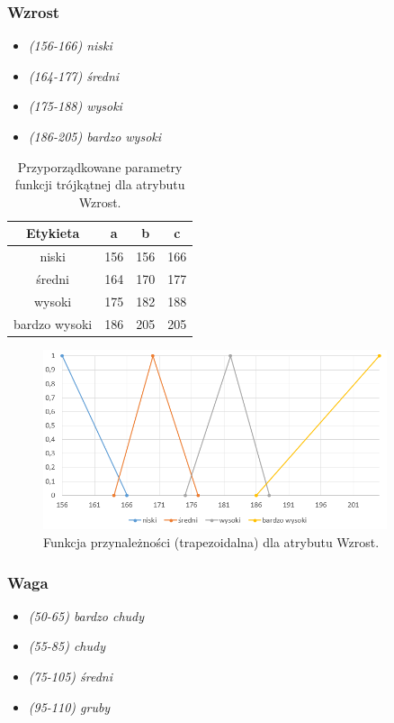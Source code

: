 \documentclass{classrep}
\begin{document}
	\newpage
	\subsubsection{Wzrost}
	\begin{itemize}
		\item \textsl{(156-166) niski}
		\item \textsl{(164-177) średni}
		\item \textsl{(175-188) wysoki}
		\item \textsl{(186-205) bardzo wysoki}
	\end{itemize}
	
	\begin{table}[h!]
		\centering
		\begin{tabular} {c c c c}
			\hline
			\textbf{Etykieta} & \textbf{a} & \textbf{b} & \textbf{c} \\ [0.5ex] 
			\hline	
			\hline 
			niski & 156 & 156 & 166 \\
			średni & 164 & 170 & 177 \\
			wysoki & 175 & 182 & 188 \\
			bardzo wysoki & 186 & 205 & 205  \\
			\hline
		\end{tabular}
		\caption{Przyporządkowane parametry funkcji trójkątnej dla atrybutu Wzrost. }
		\label{tabelaWzrost}
	\end{table}
	
	\begin{figure}[h!]
		\centering
		\includegraphics[width=0.9\textwidth]{zmienne/2.png}
		\caption{Funkcja przynależności (trapezoidalna) dla atrybutu Wzrost.}
		\label{wykresWzrost}
	\end{figure}

	\newpage
	\subsubsection{Waga}
	\begin{itemize}
		\item \textsl{(50-65) bardzo chudy}
		\item \textsl{(55-85) chudy}
		\item \textsl{(75-105) średni}
		\item \textsl{(95-110) gruby}
	\end{itemize}
	
\end{document}
